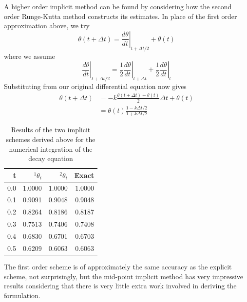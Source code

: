 \documentclass[10pt]{article}
\begin{document}
	A higher order implicit method can be found by considering how the second order
	Runge-Kutta method constructs its estimates. In place of the first order
	approximation above, we try
		\begin{equation}
			\theta(t+\Delta t) = \left. \frac{d \theta}{d t} \right|_{t+\Delta t/2} + \theta(t)
		\end{equation}	
	where we assume
		\begin{equation}
			\left. \frac{d \theta}{d t} \right|_{t+\Delta t/2} = 
				\frac{1}{2} \left. \frac{d \theta}{d t} \right|_{t+\Delta t} + 
				\frac{1}{2} \left. \frac{d \theta}{d t} \right|_{t} 
		\end{equation}
	Substituting from our original differential equation now gives
		\begin{equation}
			\begin{split}
				\theta(t+\Delta t) &= -k\frac{\theta(t+\Delta t) + \theta(t)}{2} \Delta t + \theta(t) \\
							&= \theta(t) \frac{1-k\Delta t / 2}{1+k\Delta t / 2}
			\end{split}
		\end{equation}	

	
		\begin{table}[h]
			\begin{center}
				\begin{tabular} {r | r r r}
					t	& $^1\theta_i$ & $^2\theta_i$ & Exact \\ \hline
					0.0   & 1.0000 & 1.0000	& 		1.0000 \\
					0.1	& 0.9091	& 0.9048 & 	0.9048 \\
					0.2	& 0.8264	& 0.8186 & 	0.8187 \\
					0.3   & 0.7513	&	0.7406 &	0.7408 \\
					0.4	 & 0.6830	& 0.6701 & 	0.6703 \\
					0.5	& 0.6209	& 0.6063 & 	0.6063 
				\end{tabular}	
			\caption[]{Results of the two implicit schemes derived above for the numerical
			integration of the decay equation}
			\end{center}
		\end{table}
	  
	The first order scheme is of approximately the same accuracy as the
	explicit scheme, not surprisingly, but the mid-point implicit method has 
	very impressive results considering that there is very little
	extra work involved in deriving the formulation.
\end{document}
